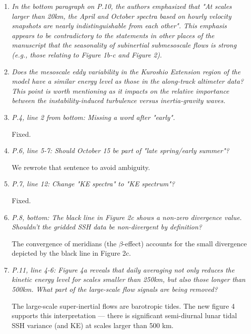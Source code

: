 \documentclass[11pt]{article}
\newcommand{\bdp}{\begin{description}}
\newcommand{\edp}{\end{description}}
\begin{document}
\begin{enumerate}


\item {\it In the bottom paragraph on P.10, the authors emphasized that "At scales larger
than 20km, the April and October spectra based on hourly velocity snapshots are
nearly indistinguishable from each other". This emphasis appears to be contradictory
to the statements in other places of the manuscript that the seasonality of subinertial
submesoscale flows is strong (e.g., those relating to Figure 1b-c and Figure 2).}

\item {\it Does the mesoscale eddy variability in the Kuroshio Extension region of the model
have a similar energy level as those in the along-track altimeter data? This point
is worth mentioning as it impacts on the relative importance between the instability-induced
turbulence versus inertia-gravity waves.}

\item {\it P.4, line 2 from bottom: Missing a word after "early".}

  Fixed.

\item {\it P.6, line 5-7: Should October 15 be part of "late spring/early summer"?}

  We rewrote that sentence to avoid ambiguity.

\item {\it P.7, line 12: Change "KE spectra" to "KE spectrum"?}

Fixed.

\item {\it P.8, bottom: The black line in Figure 2c shows a non-zero divergence value.
      Shouldn't the gridded SSH data be non-divergent by definition?}

  The convergence of meridians (the $\beta$-effect) accounts for the
  small divergence depicted by the black line in Figure 2c.

\item {\it P.11, line 4-6: Figure 4a reveals that daily averaging not only reduces the
      kinetic energy level for scales smaller than 250km, but also those longer
      than 500km. What part of the large-scale flow signals are being removed?}

  \bdp
  The large-scale super-inertial flows are barotropic tides. The new figure 4
  supports this interpretation --- there is significant semi-diurnal lunar
  tidal SSH variance (and KE) at scales larger than 500 km.
  \edp

\end{enumerate}
\end{document}
